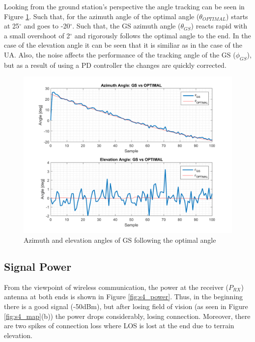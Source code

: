 Looking from the ground station's perspective the angle tracking can be seen in Figure \ref{fig:s4_gs}. Such that, for the azimuth angle of the optimal angle ($\theta_{OPTIMAL}$) starts at 25$^{\circ}$ and goes to -20$^{\circ}$. Such that, the GS azimuth angle ($\theta_{GS}$) reacts rapid with a small overshoot of 2$^{\circ}$ and rigorously follows the optimal angle to the end. In the case of the elevation angle it can be seen that it is similiar as in the case of the UA. Also, the noise affects the performance of the tracking angle of the GS ($\phi_{GS}$), but as a result of using a PD controller the changes are quickly corrected.

\begin{figure}[H]
	\centering
	\includegraphics[scale=0.8]{figures/s4_gs.png}
	\caption{Azimuth and elevation angles of GS following the optimal angle}
	\label{fig:s4_gs}
\end{figure}

\subsection*{Signal Power}
From the viewpoint of wireless communication, the power at the receiver ($P_{RX}$) antenna at both ends is shown in Figure \ref{fig:s4_power}. Thus, in the beginning there is a good signal (-50dBm), but after losing field of vision (as seen in Figure \ref{fig:s4_map}(b)) the power drops considerably, losing connection. Moreover, there are two spikes of connection loss where LOS is lost at the end due to terrain elevation.


